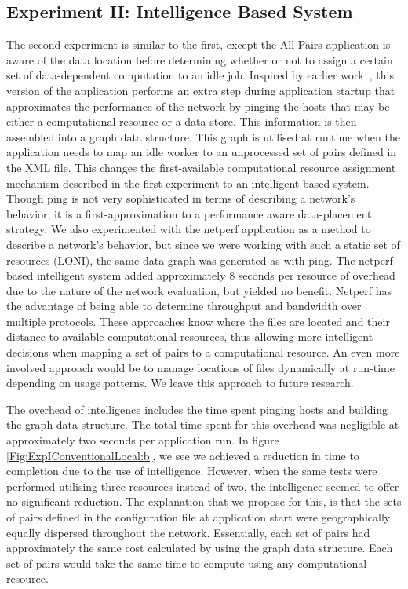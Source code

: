 \documentclass{rspublic}
\begin{document}
\subsection{Experiment II: Intelligence Based System}\label{Sec:Intelligence}
The second experiment is similar to the first, except the All-Pairs
application is aware of the data location before determining whether or
not to assign a certain set of data-dependent computation to an idle
job. Inspired by earlier work~\citep{netperf}, this version of the
application performs an extra step during application startup that
approximates the performance of the network by pinging the hosts that
may be either a computational resource or a data store. This information
is then assembled into a graph data structure. This graph is utilised at
runtime when the application needs to map an idle worker to an
unprocessed set of pairs defined in the XML file. This changes the
first-available computational resource assignment mechanism described in
the first experiment to an intelligent based system. Though ping is not
very sophisticated in terms of describing a network's behavior, it is a
first-approximation to a performance aware data-placement strategy. We
also experimented with the netperf application \citep{netperf_web} as a
method to describe a network's behavior, but since we were working with
such a static set of resources (LONI), the same data graph was generated
as with ping. The netperf-based intelligent system added approximately 8
seconds per resource of overhead due to the nature of the network
evaluation, but yielded no benefit.  Netperf has the advantage of being
able to determine throughput and bandwidth over multiple protocols.
These approaches know where the files are located and their distance to
available computational resources, thus allowing more intelligent
decisions when mapping a set of pairs to a computational resource. An
even more involved approach would be to manage locations of files
dynamically at run-time depending on usage patterns. We leave this
approach to future research. 

The overhead of intelligence includes the time spent pinging hosts and
building the graph data structure. The total time spent for this
overhead was negligible at approximately two seconds per application
run. In figure \ref{Fig:ExpIConventionalLocal:b}, we see we achieved a
reduction in time to completion due to the use of intelligence. However,
when the same tests were performed utilising three resources instead of
two, the intelligence seemed to offer no significant reduction. The
explanation that we propose for this, is that the sets of pairs defined
in the configuration file at application start were geographically
equally dispersed throughout the network. Essentially, each set of pairs
had approximately the same cost calculated by using the graph data
structure. Each set of pairs would take the same time to compute using
any computational resource.
\end{document}
